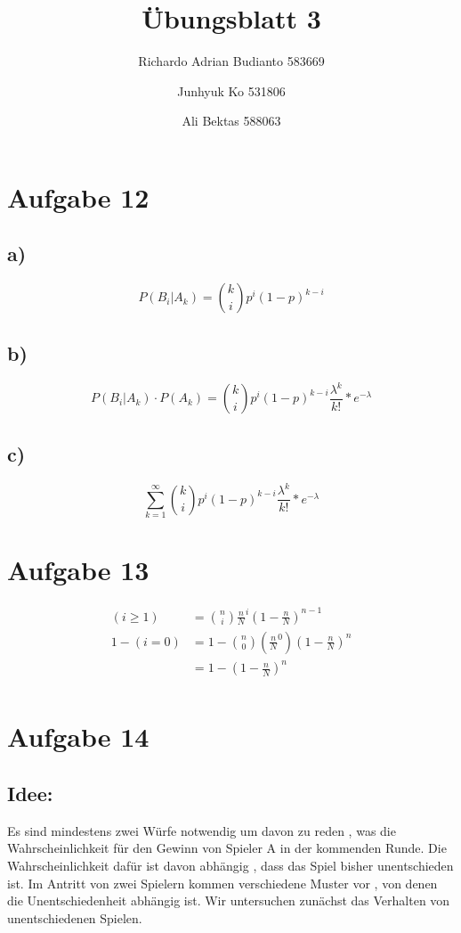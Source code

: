 \documentclass{article}
\title{Übungsblatt 3}
\author{Richardo Adrian Budianto  583669 \and Junhyuk Ko  531806 \and Ali Bektas 588063 }
\begin{document}
\maketitle



\section*{Aufgabe 12}
\subsection*{a)}
\[ P(B_i | A_k) = \binom{k}{i} p^i (1-p)^{k-i}  \]
\subsection*{b)}
\[  P(B_i | A_k) \cdot P(A_k) =  \binom{k}{i} p^i (1-p)^{k-i} \frac{\lambda^k}{k!}*e^{-\lambda}  \]
\subsection*{c)}
\[ \sum_{k=1}^{\infty} \binom{k}{i} p^i (1-p)^{k-i} \frac{\lambda^k}{k!}*e^{-\lambda}  \]

\section*{Aufgabe 13}
\begin{align*}
(i \geq 1) &= \binom{n}{i} \frac{n}{N}^i (1-\frac{n}{N})^{n-1}\\
1 - (i=0) &= 1 - \binom{n}{0}(\frac{n}{N}^0)(1-\frac{n}{N})^n\\
 	&= 1 - (1 - \frac{n}{N})^n\\
\end{align*}

\section*{Aufgabe 14}
\subsection*{Idee:}
Es sind mindestens zwei Würfe notwendig um davon zu reden , was die Wahrscheinlichkeit für den Gewinn von Spieler A in der kommenden Runde. Die Wahrscheinlichkeit dafür ist davon abhängig , dass das Spiel bisher unentschieden ist. Im Antritt von zwei Spielern kommen verschiedene Muster vor , von denen die Unentschiedenheit abhängig ist. Wir untersuchen zunächst das Verhalten von unentschiedenen Spielen. 
\end{document}
